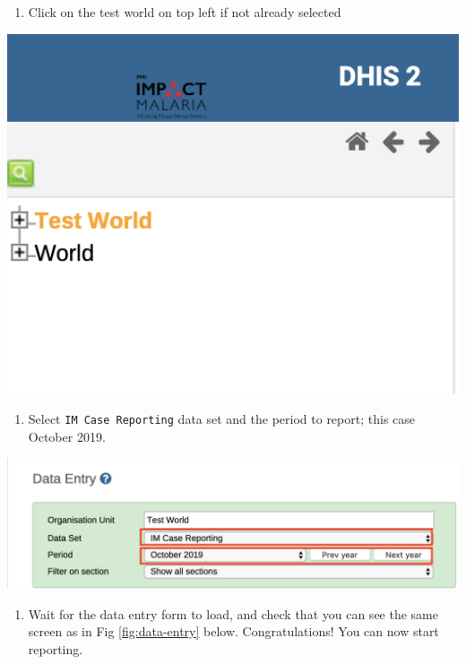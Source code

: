 \documentclass[]{book}
\providecommand{\tightlist}{%
  \setlength{\itemsep}{0pt}\setlength{\parskip}{0pt}}
\begin{document}
\begin{enumerate}
\def\labelenumi{\arabic{enumi}.}
\setcounter{enumi}{2}
\tightlist
\item
  Click on the test world on top left if not already selected
\end{enumerate}

\includegraphics[width=6.58in]{./images/test-world}

\begin{enumerate}
\def\labelenumi{\arabic{enumi}.}
\setcounter{enumi}{3}
\tightlist
\item
  Select \texttt{IM\ Case\ Reporting} data set and the period to report; this case October 2019.
\end{enumerate}

\includegraphics[width=17.36in]{./images/im-reporting}

\begin{enumerate}
\def\labelenumi{\arabic{enumi}.}
\setcounter{enumi}{4}
\tightlist
\item
  Wait for the data entry form to load, and check that you can see the same screen as in Fig \ref{fig:data-entry} below. Congratulations! You can now start reporting.
\end{enumerate}
\end{document}
